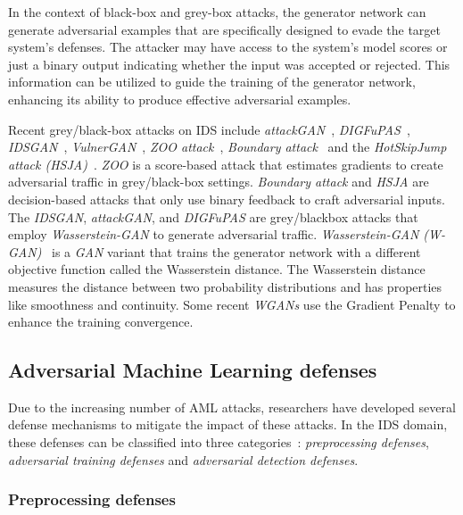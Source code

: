 In the context of black-box and grey-box attacks, the generator network can generate adversarial examples that are
specifically designed to evade the target system's defenses.
The attacker may have access to the system's model scores or just a binary output indicating whether the input was
accepted or rejected.
This information can be utilized to guide the training of the generator network, enhancing its ability to produce
effective adversarial examples.

Recent grey/black-box attacks on IDS include \textit{attackGAN}~\cite{zhao2021attackgan}, \textit{DIGFuPAS}~\cite{duy2021digfupas},
\textit{IDSGAN}~\cite{lin2022idsgan}, \textit{VulnerGAN}~\cite{liu2022vulnergan}, \textit{ZOO attack}~\cite{chen2017zoo},
\textit{Boundary attack}~\cite{chen2019boundary} and the \textit{HotSkipJump attack (HSJA)}~\cite{chen2020hopskipjumpattack}.
\textit{ZOO} is a score-based attack that estimates gradients to create adversarial traffic in grey/black-box settings.
\textit{Boundary attack} and \textit{HSJA} are decision-based attacks that only use binary feedback to craft adversarial inputs.
The \textit{IDSGAN}, \textit{attackGAN}, and \textit{DIGFuPAS} are grey/blackbox attacks that employ \textit{Wasserstein-GAN} to generate adversarial traffic.
\textit{Wasserstein-GAN (W-GAN)}~\cite{gulrajani2017improved} is a \textit{GAN} variant that trains the generator network with a different
objective function called the Wasserstein distance.
The Wasserstein distance measures the distance between two probability distributions and has properties like
smoothness and continuity.
Some recent \textit{WGANs} use the Gradient Penalty to enhance the training convergence.


\subsection{Adversarial Machine Learning defenses}\label{subsec:adversarial-machine-learning-defenses}

Due to the increasing number of AML attacks, researchers have developed several defense mechanisms to mitigate the
impact of these attacks.
In the IDS domain, these defenses can be classified into three categories~\cite{alotaibi2023adversarial}:
\textit{preprocessing defenses}, \textit{adversarial training defenses} and \textit{adversarial detection defenses}.

\subsubsection{Preprocessing defenses}\label{subsubsec:preprocessing-defenses}

